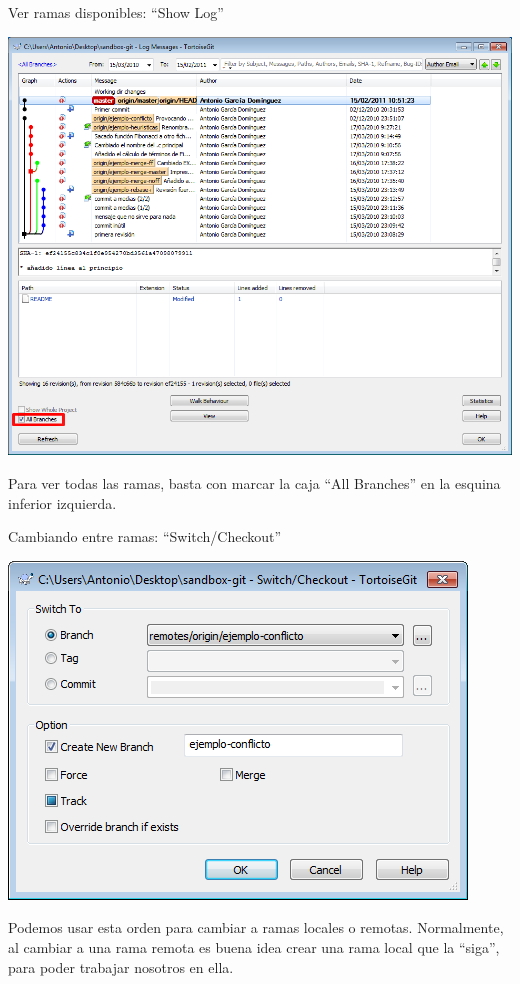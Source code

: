 \documentclass[xcolor=svgnames]{beamer}
\begin{document}
\begin{frame}{Ver ramas disponibles: ``Show Log''}
  \begin{center}
    \includegraphics[width=\textwidth,height=.7\textheight,keepaspectratio]{tomas/gitlogramas}
  \end{center}

  Para ver todas las ramas, basta con marcar la caja ``All Branches''
  en la esquina inferior izquierda.
\end{frame}

\begin{frame}{Cambiando entre ramas: ``Switch/Checkout''}
  \begin{center}
    \includegraphics[width=\textwidth,height=.65\textheight,keepaspectratio]{tomas/checkout}
  \end{center}

  Podemos usar esta orden para cambiar a ramas locales o
  remotas. Normalmente, al cambiar a una rama remota es buena idea
  crear una rama local que la ``siga'', para poder trabajar nosotros
  en ella.
\end{frame}
\end{document}
